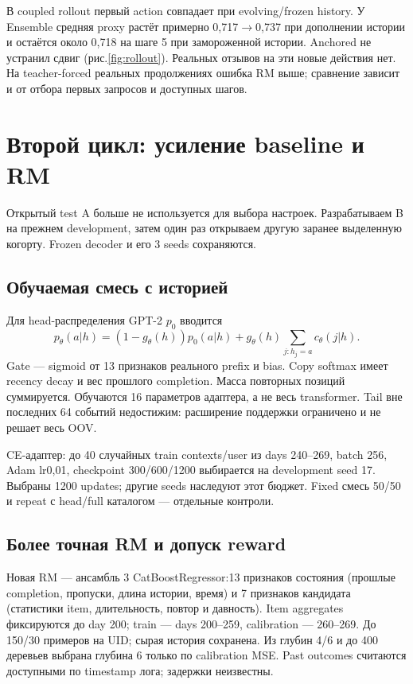 \documentclass[10pt,a4paper,twocolumn]{article}
\begin{document}
В coupled rollout первый action совпадает при evolving/frozen history.
У Ensemble средняя proxy растёт примерно 0{,}717$\to$0{,}737 при дополнении
истории и остаётся около 0{,}718 на шаге 5 при замороженной истории.
Anchored не устранил сдвиг (рис.\ref{fig:rollout}). Реальных отзывов на
эти новые действия нет. На teacher-forced реальных продолжениях ошибка
RM выше; сравнение зависит и от отбора первых запросов и доступных шагов.

\section{Второй цикл: усиление baseline и RM}

Открытый test A больше не используется для выбора настроек.
Разрабатываем B на прежнем development, затем один раз открываем
другую заранее выделенную когорту. Frozen decoder и его 3 seeds сохраняются.

\subsection{Обучаемая смесь с историей}
Для head-распределения GPT-2 $p_0$ вводится
\begin{equation}
p_\theta(a|h)=(1-g_\theta(h))p_0(a|h)
+g_\theta(h)\sum_{j:h_j=a}c_\theta(j|h).
\end{equation}
Gate --- sigmoid от 13 признаков реального prefix и bias.
Copy softmax имеет recency decay и вес прошлого completion.
Масса повторных позиций суммируется. Обучаются 16 параметров адаптера,
а не весь transformer. Tail вне последних 64 событий недостижим:
расширение поддержки ограничено и не решает весь OOV.

CE-адаптер: до 40 случайных train contexts/user из days 240--269,
batch 256, Adam lr0{,}01, checkpoint 300/600/1200 выбирается на development
seed 17. Выбраны 1200 updates; другие seeds наследуют этот бюджет.
Fixed смесь 50/50 и repeat с head/full каталогом --- отдельные контроли.

\subsection{Более точная RM и допуск reward}
Новая RM --- ансамбль 3 CatBoostRegressor:13 признаков состояния
(прошлые completion, пропуски, длина истории, время) и 7 признаков
кандидата (статистики item, длительность, повтор и давность).
Item aggregates фиксируются до day 200; train --- days 200--259,
calibration --- 260--269. До 150/30 примеров на UID; сырая история сохранена.
Из глубин 4/6 и до 400 деревьев выбрана глубина 6 только по calibration MSE.
Past outcomes считаются доступными по timestamp лога; задержки неизвестны.
\end{document}
